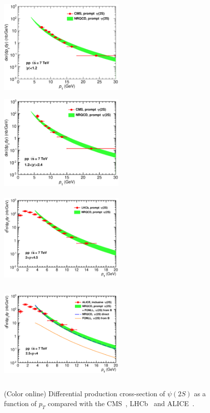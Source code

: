 \documentclass{iopart}
\begin{document}
\begin{figure}[t]
\begin{center}
\includegraphics[width=6.15cm,height=5.0cm,angle=0]{Prompt_PSIP_CMS_12-12_7TeV.eps}~~~~ \includegraphics[width=6.15cm,height=5.0cm,angle=0]{Prompt_PSIP_CMS_12_24_7TeV.eps}~~~~\\ \includegraphics[width=6.15cm,height=5.0cm,angle=0]{7TeV_Prompt_PsiP_LHCb_all.eps}~~~~ \includegraphics[width=6.15cm,height=5.0cm,angle=0]{7TeV_Inclusive_PsiP_ALICE_all.eps}
\end{center}
\caption{(Color online) Differential production cross-section of $\psi(2S)$ as a function of $p_{T}$ compared with the 
CMS~\cite{jhep02}, LHCb~\cite{epjc72} and ALICE~\cite{epjc}.}
\label{fig2}
\end{figure}
\end{document}
